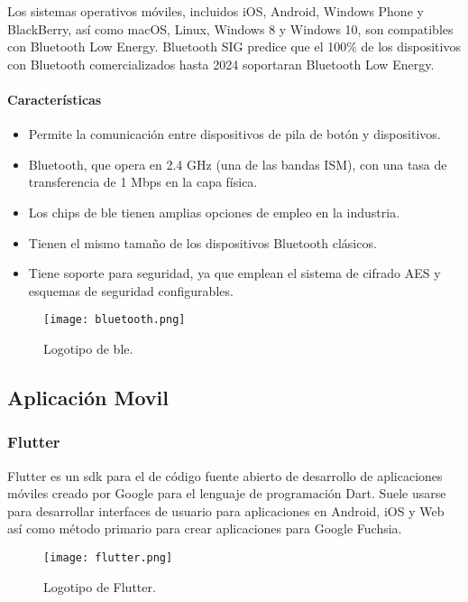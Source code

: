     Los sistemas operativos móviles, incluidos iOS, Android, Windows Phone y BlackBerry, así como macOS,
    Linux, Windows 8 y Windows 10, son compatibles con Bluetooth Low Energy. Bluetooth SIG predice que
    el 100\% de los dispositivos con Bluetooth comercializados hasta 2024 soportaran Bluetooth Low Energy.

    \paragraph{Características}
    \begin{itemize}
        \item Permite la comunicación entre dispositivos de pila de botón y dispositivos.
        \item Bluetooth, que opera en 2.4 GHz (una de las bandas ISM), con una tasa de transferencia de 1 Mbps en la capa física.
        \item Los chips de \acrshort{ble} tienen amplias opciones de empleo en la industria.
        \item Tienen el mismo tamaño de los dispositivos Bluetooth clásicos.
        \item Tiene soporte para seguridad, ya que emplean el sistema de cifrado AES y esquemas de seguridad configurables.
    \end{itemize}

    \begin{figure}[htp!]
        \centering
        \texttt{[image: bluetooth.png]}
        \caption{Logotipo de \acrshort{ble}.}
        \label{fig: bluetooth}
    \end{figure}
    \FloatBarrier

\subsection{Aplicación Movil}
    \subsubsection{Flutter}    
    Flutter es un \acrshort{sdk} para el de código fuente abierto de desarrollo de aplicaciones móviles creado por Google 
    para el lenguaje de programación Dart. Suele usarse para desarrollar interfaces de usuario para aplicaciones en Android, iOS y Web 
    así como método primario para crear aplicaciones para Google Fuchsia.​

    \begin{figure}[htp!]
        \centering
        \texttt{[image: flutter.png]}
        \caption{Logotipo de Flutter.}
        \label{fig: flutter}
    \end{figure}
    \FloatBarrier

